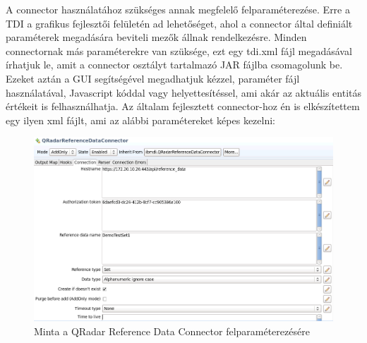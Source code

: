 A connector használatához szükséges annak megfelelő felparaméterezése. Erre a TDI a grafikus fejlesztői felületén ad lehetőséget, ahol a connector által definiált paraméterek megadására beviteli mezők állnak rendelkezésre. Minden connectornak más paraméterekre van szüksége, ezt egy tdi.xml fájl megadásával írhatjuk le, amit a connector osztályt tartalmazó JAR fájlba csomagolunk be. Ezeket aztán a GUI segítségével megadhatjuk kézzel, paraméter fájl használatával, Javascript kóddal vagy helyettesítéssel, ami akár az aktuális entitás értékeit is felhasználhatja. Az általam fejlesztett connector-hoz én is elkészítettem egy ilyen xml fájlt, ami az alábbi paramétereket képes kezelni:
\begin{figure}
	\centering
	\includegraphics[width=0.7\linewidth]{figures/conn_test/parameters}
	\caption{Minta a QRadar Reference Data Connector felparaméterezésére}
	\label{fig:parameters}
\end{figure}

